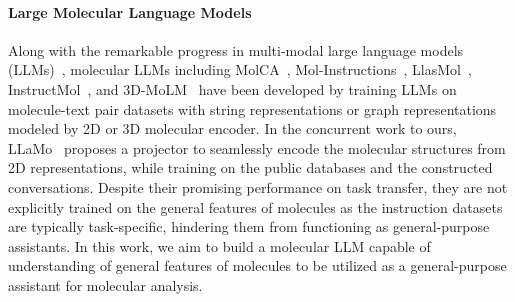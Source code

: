 \paragraph{Large Molecular Language Models}
Along with the remarkable progress in multi-modal large language models (LLMs)~\cite{liu2024LLAVA,liu2024LLAVA1.5,xu2024llavacot}, molecular LLMs including MolCA~\cite{liu-etal-2023-molca}, Mol-Instructions~\cite{fang2023molinstruction},  LlasMol~\cite{yu2024llasmol}, InstructMol~\cite{cao2023instructmol}, and 3D-MoLM~\cite{li2024molm} have been developed by training LLMs on molecule-text pair datasets with string representations or graph representations modeled by 2D or 3D molecular encoder. In the concurrent work to ours, LLaMo~\cite{park2024llamo} proposes a projector to seamlessly encode the molecular structures from 2D representations, while training on the public databases and the constructed conversations. Despite their promising performance on task transfer, they are not explicitly trained on the general features of molecules as the instruction datasets are typically task-specific, hindering them from functioning as general-purpose assistants. In this work, we aim to build a molecular LLM capable of understanding of general features of molecules to be utilized as a general-purpose assistant for molecular analysis.